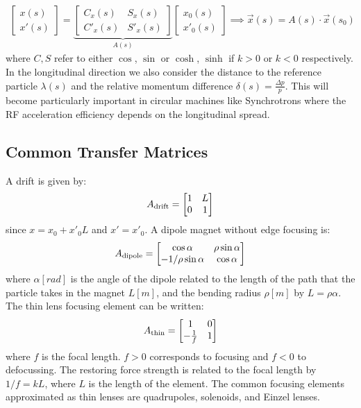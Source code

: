 \documentclass{article}
\numberwithin{equation}{section}
\begin{document}
\begin{align}
\begin{bmatrix} x(s) \\ x'(s) \end{bmatrix} =
\underbrace{\begin{bmatrix} C_x(s) & S_x(s) \\ C'_x(s) & S'_x(s) \end{bmatrix}}_{A(s)}
\begin{bmatrix} x_0(s) \\ x'_0(s) \end{bmatrix} \implies \vec{x}(s) = A(s) \cdot \vec{x}(s_0)
\end{align}
where $C,S$ refer to either $\cos$, $\sin$ or $\cosh$, $\sinh$ if $k>0$ or $k<0$ respectively. In the longitudinal direction we also consider the distance to the reference particle $\lambda(s)$ and the relative momentum difference $\delta(s) = \frac{\Delta p}{p}$. This will become particularly important in circular machines like Synchrotrons where the RF acceleration efficiency depends on the longitudinal spread. 

\subsection{Common Transfer Matrices}

A drift is given by: 
\begin{align}
A_{\rm drift} = \begin{bmatrix} 1 & L \\ 0 & 1 \end{bmatrix}
\end{align}
since $x=x_0+x'_0L$ and $x' = x'_0$. A dipole magnet without edge focusing is:
\begin{align}
A_{\rm dipole} = \begin{bmatrix} \cos \alpha & \rho \sin \alpha \\ -1/\rho \sin \alpha & \cos \alpha \end{bmatrix}
\end{align}
where $\alpha [\si{rad}]$ is the angle of the dipole related to the length of the path that the particle takes in the magnet $L [\si{m}]$, and the bending radius $\rho [\si{m}]$ by $L = \rho \alpha$. The thin lens focusing element can be written:
\begin{align}
A_{\rm thin} = \begin{bmatrix} 1 & 0 \\ -\frac{1}{f} & 1 \end{bmatrix}
\end{align}
where $f$ is the focal length. $f>0$ corresponds to focusing and $f<0$ to defocussing. The restoring force strength is related to the focal length by $1/f = k L$, where $L$ is the length of the element. The common focusing elements approximated as thin lenses are quadrupoles, solenoids, and Einzel lenses.
\end{document}
